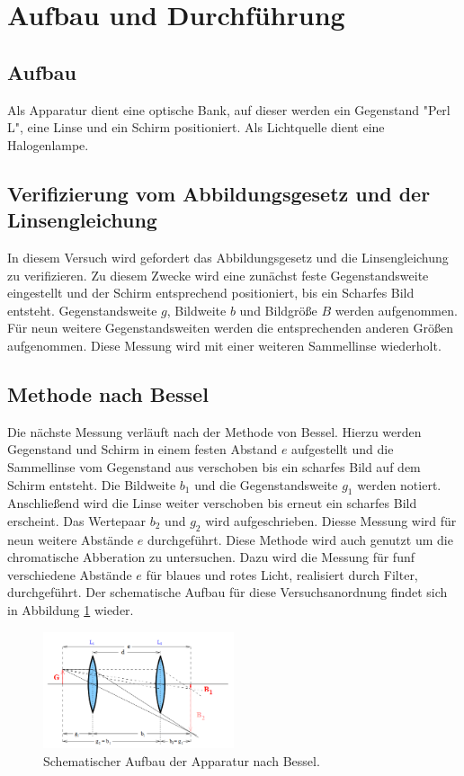 \section{Aufbau und Durchführung}
\label{sec:Durchführung}
\subsection{Aufbau}
Als Apparatur dient eine optische Bank, auf dieser werden ein Gegenstand "Perl L", eine Linse und ein Schirm
positioniert. Als Lichtquelle dient eine Halogenlampe.
\subsection{Verifizierung vom Abbildungsgesetz und der Linsengleichung}
In diesem Versuch wird gefordert das Abbildungsgesetz und die Linsengleichung zu verifizieren.
Zu diesem Zwecke wird eine zunächst feste Gegenstandsweite eingestellt und der Schirm entsprechend
positioniert, bis ein Scharfes Bild entsteht. Gegenstandsweite $g$, Bildweite $b$ und Bildgröße $B$ werden
aufgenommen. Für neun weitere Gegenstandsweiten werden die entsprechenden anderen Größen aufgenommen.
Diese Messung wird mit einer weiteren Sammellinse wiederholt.
\subsection{Methode nach Bessel}
Die nächste Messung verläuft nach der Methode von Bessel. Hierzu werden Gegenstand und Schirm
in einem festen Abstand $e$ aufgestellt und die Sammellinse vom Gegenstand aus verschoben bis ein scharfes Bild
auf dem Schirm entsteht. Die Bildweite $b_\mathrm{1}$ und die Gegenstandsweite $g_\mathrm{1}$ werden
notiert. Anschließend wird die Linse weiter verschoben bis erneut ein scharfes Bild erscheint.
Das Wertepaar $b_\mathrm{2}$ und $g_\mathrm{2}$ wird aufgeschrieben. Diesse Messung wird für neun
weitere Abstände $e$ durchgeführt.
Diese Methode wird auch genutzt um die chromatische Abberation zu untersuchen. Dazu wird die Messung
für funf verschiedene Abstände $e$ für blaues und rotes Licht, realisiert durch Filter, durchgeführt.
Der schematische Aufbau für diese Versuchsanordnung findet sich in Abbildung \ref{fig:bessel} wieder.
\begin{figure}
 \centering
 \includegraphics[width=0.5\textwidth]{bessel.png}
 \caption{Schematischer Aufbau der Apparatur nach Bessel\cite{sample}.}
 \label{fig:bessel}
 \end{figure}
